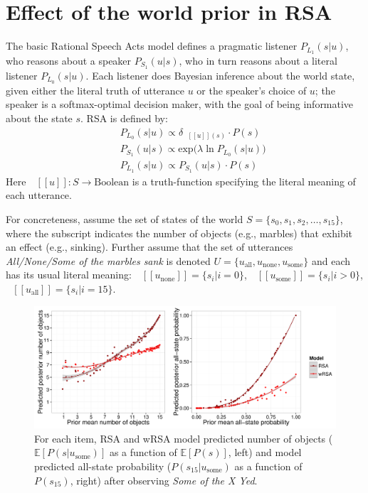 \documentclass[10pt,letterpaper]{article}
\newcommand{\denote}[1]{\mbox{ $[\![ #1 ]\!]$}}
\begin{document}
\section{Effect of the world prior in RSA}

The basic Rational Speech Acts model defines a pragmatic listener $P_{L_1}(s|u)$, who reasons about a speaker $P_{S_1}(u|s)$, who in turn reasons about a literal listener $P_{L_0}(s|u)$. Each listener does Bayesian inference about the world state, given either the literal truth of utterance $u$ or the speaker's choice of $u$; the speaker is a softmax-optimal decision maker, with the goal of being informative about the state $s$.
RSA is defined by:
\begin{eqnarray}
&&P_{L_0}(s|u)\propto \delta_{\denote{u}(s)} \cdot P(s)\\
&&P_{S_1}(u|s) \propto \mathrm{exp}({\lambda \ln P_{L_0}(s|u))}\\ 
&&P_{L_1}(s|u)\propto P_{S_1}(u|s)\cdot P(s)
\end{eqnarray}
Here $\denote{u}: S \rightarrow \text{Boolean}$ is a truth-function specifying the literal meaning of each utterance.

For concreteness, assume the set of states of the world $S = \{s_0, s_1, s_2, \dots, s_{15}\}$, where the subscript indicates the number of objects (e.g., marbles) that exhibit an effect (e.g., sinking). 
Further assume that the set of utterances \emph{All/None/Some of the marbles sank} is denoted $U = \{u_{\textrm{all}}, u_{\textrm{none}}, u_{\textrm{some}}\}$ and each has its usual literal meaning: 
$\denote{u_{\textrm{none}}}= \{s_i | i = 0\}$,  
$\denote{u_{\textrm{some}}}= \{s_i | i > 0\}$,
$\denote{u_{\textrm{all}}}= \{s_i | i = 15\}$.


\begin{figure}
\centering
	\includegraphics[width=.8\textwidth]{pics/rsa-predictions}
	\caption{For each item, RSA and wRSA model predicted number of objects ($\mathbb{E}[P(s|u_{\textrm{some}})]$ as a function of $\mathbb{E}[P(s)]$, left) and model predicted all-state probability  ($P(s_{15}|u_{\textrm{some}})$ as a function of $P(s_{15})$, right) after observing \emph{Some of the X Yed}.}
	\label{fig:rrsaexppredictions}	
\end{figure}
\end{document}
